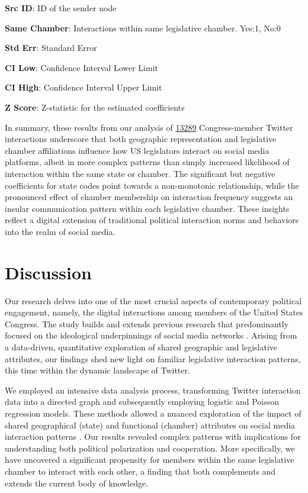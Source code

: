\documentclass[11pt]{article}
\begin{document}
\begin{table}[h]
\begin{threeparttable}
\begin{tablenotes}
\item \textbf{Src ID}: ID of the sender node
\item \textbf{Same Chamber}: Interactions within same legislative chamber. Yes:1, No:0
\item \textbf{Std Err}: Standard Error
\item \textbf{CI Low}: Confidence Interval Lower Limit
\item \textbf{CI High}: Confidence Interval Upper Limit
\item \textbf{Z Score}: Z-statistic for the estimated coefficients
\end{tablenotes}
\end{threeparttable}
\end{table}


In summary, these results from our analysis of \hyperlink{R0a}{13289} Congress-member Twitter interactions underscore that both geographic representation and legislative chamber affiliations influence how US legislators interact on social media platforms, albeit in more complex patterns than simply increased likelihood of interaction within the same state or chamber. The significant but negative coefficients for state codes point towards a non-monotonic relationship, while the pronounced effect of chamber membership on interaction frequency suggests an insular communication pattern within each legislative chamber. These insights reflect a digital extension of traditional political interaction norms and behaviors into the realm of social media.

\section*{Discussion}

Our research delves into one of the most crucial aspects of contemporary political engagement, namely, the digital interactions among members of the United States Congress. The study builds and extends previous research that predominantly focused on the ideological underpinnings of social media networks \cite{Conover2011PoliticalPO, Gaumont2018ReconstructionOT, Chamberlain2021ANA}. Arising from a data-driven, quantitative exploration of shared geographic and legislative attributes, our findings shed new light on familiar legislative interaction patterns, this time within the dynamic landscape of Twitter.

We employed an intensive data analysis process, transforming Twitter interaction data into a directed graph and subsequently employing logistic and Poisson regression models. These methods allowed a nuanced exploration of the impact of shared geographical (state) and functional (chamber) attributes on social media interaction patterns \cite{Hayes2009ComputationalPF, Ovaskainen2010ModelingSC, Park2008PenalizedLR}. Our results revealed complex patterns with implications for understanding both political polarization and cooperation. More specifically, we have uncovered a significant propensity for members within the same legislative chamber to interact with each other, a finding that both complements and extends the current body of knowledge.
\end{document}
